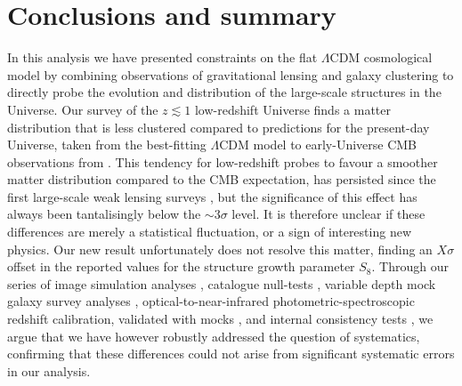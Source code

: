 \section{Conclusions and summary}
\label{sec:conc}
In this analysis we have presented constraints on the flat $\Lambda$CDM cosmological model by combining observations of gravitational lensing and galaxy clustering to directly probe the evolution and distribution of the large-scale structures in the Universe.    Our survey of the $z \lesssim 1$ low-redshift Universe finds a matter distribution that is less clustered compared to predictions for the present-day Universe, taken from the best-fitting $\Lambda$CDM model to early-Universe CMB observations from \citet{planck/etal:2018}.  This tendency for low-redshift probes to favour a smoother matter distribution compared to the CMB expectation, has persisted since the first large-scale weak lensing surveys \citep{heymans/etal:2013}, but the significance of this effect has always been tantalisingly below the $\sim 3\sigma$ level.   It is therefore unclear if these differences are merely a statistical fluctuation, or a sign of interesting new physics.    Our new result unfortunately does not resolve this matter, finding an $X\sigma$ offset in the reported values for the structure growth parameter $S_8$.   Through our series of image simulation analyses \citep{kannawadi/etal:2019}, catalogue null-tests \citep{giblin/etal:inprep}, variable depth mock galaxy survey analyses \citep{joachimi/etal:inprep}, optical-to-near-infrared photometric-spectroscopic redshift calibration, validated with mocks \citep{wright/etal:2019, vandenbusch/etal:inprep,hildebrandt/etal:inprep}, and internal consistency tests \citep{asgari/etal:inprep}, we argue that we have however robustly addressed the question of systematics, confirming that these differences could not arise from significant systematic errors in our analysis.


